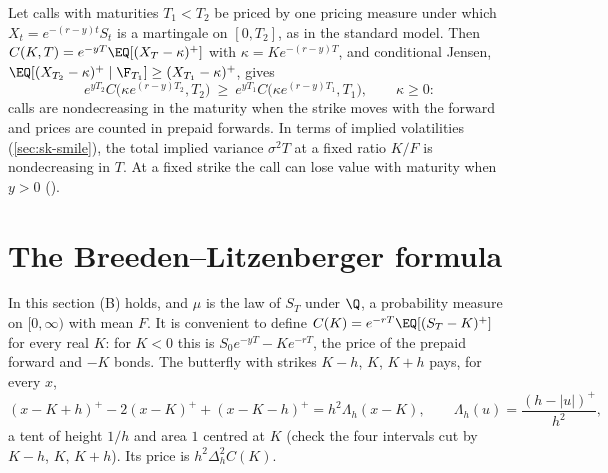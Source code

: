 \begin{remark}\label{rem:sk-calendar}
Let calls with maturities $T_1<T_2$ be priced by one pricing measure under which
$X_t=e^{-(r-y)t}S_t$ is a martingale on $[0,T_2]$, as in the standard model. Then
$C(K,T)=e^{-yT}\EQ[(X_T-\kappa)^+]$ with $\kappa=Ke^{-(r-y)T}$, and conditional Jensen,
$\EQ[(X_{T_2}-\kappa)^+\mid\F_{T_1}]\ge(X_{T_1}-\kappa)^+$, gives
\begin{equation}\label{eq:sk-calendar}
  e^{yT_2}C\big(\kappa e^{(r-y)T_2},T_2\big)\ \ge\ e^{yT_1}C\big(\kappa e^{(r-y)T_1},T_1\big),\qquad\kappa\ge0 :
\end{equation}
calls are nondecreasing in the maturity when the strike moves with the forward and prices are
counted in prepaid forwards. In terms of implied volatilities (\cref{sec:sk-smile}), the total
implied variance $\sigma^2T$ at a fixed ratio $K/F$ is nondecreasing in $T$. At a fixed strike
the call can lose value with maturity when $y>0$ ().
\end{remark}

\section{The Breeden--Litzenberger formula}\label{sec:sk-bl}

In this section (B) holds, and $\mu$ is the law of $S_T$ under $\Q$, a probability measure on
$[0,\infty)$ with mean $F$. It is convenient to define $C(K)=e^{-rT}\EQ[(S_T-K)^+]$ for every real
$K$: for $K<0$ this is $S_0e^{-yT}-Ke^{-rT}$, the price of the prepaid forward and $-K$ bonds. The
butterfly with strikes $K-h$, $K$, $K+h$ pays, for every $x$,
\begin{equation}\label{eq:sk-tent}
  (x-K+h)^+-2(x-K)^++(x-K-h)^+=h^2\Lambda_h(x-K),\qquad \Lambda_h(u)=\frac{(h-|u|)^+}{h^2},
\end{equation}
a tent of height $1/h$ and area $1$ centred at $K$ (check the four intervals cut by $K-h$, $K$,
$K+h$). Its price is $h^2\Delta_h^2C(K)$.

